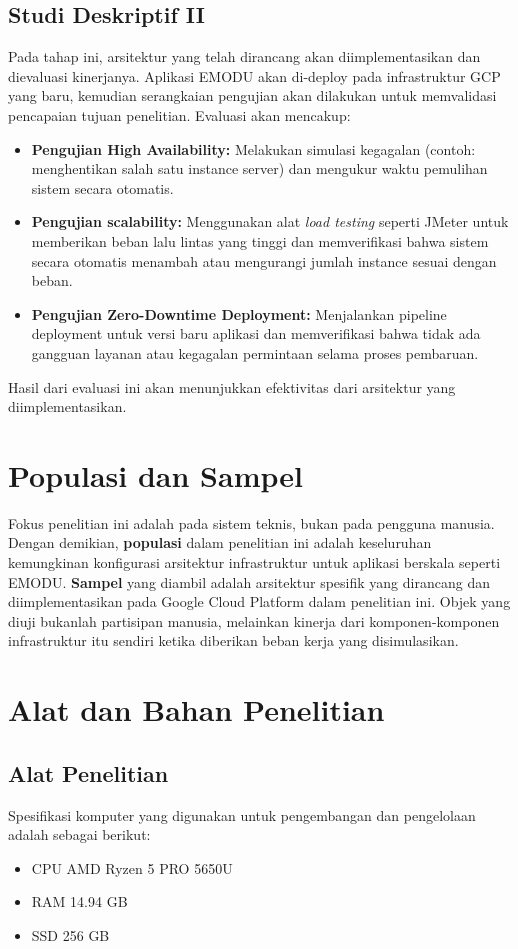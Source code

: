 \subsection{Studi Deskriptif II}
Pada tahap ini, arsitektur yang telah dirancang akan diimplementasikan dan dievaluasi kinerjanya.
Aplikasi EMODU akan di-deploy pada infrastruktur GCP yang baru, kemudian serangkaian pengujian akan dilakukan untuk memvalidasi pencapaian tujuan penelitian.
Evaluasi akan mencakup:
\begin{itemize}
    \item \textbf{Pengujian High Availability:} Melakukan simulasi kegagalan (contoh: menghentikan salah satu instance server) dan mengukur waktu pemulihan sistem secara otomatis.
    \item \textbf{Pengujian scalability:} Menggunakan alat \textit{load testing} seperti JMeter untuk memberikan beban lalu lintas yang tinggi dan memverifikasi bahwa sistem secara otomatis menambah atau mengurangi jumlah instance sesuai dengan beban.
    \item \textbf{Pengujian Zero-Downtime Deployment:} Menjalankan pipeline deployment untuk versi baru aplikasi dan memverifikasi bahwa tidak ada gangguan layanan atau kegagalan permintaan selama proses pembaruan.
\end{itemize}
Hasil dari evaluasi ini akan menunjukkan efektivitas dari arsitektur yang diimplementasikan.

\section{Populasi dan Sampel}
Fokus penelitian ini adalah pada sistem teknis, bukan pada pengguna manusia.
Dengan demikian, \textbf{populasi} dalam penelitian ini adalah keseluruhan kemungkinan konfigurasi arsitektur infrastruktur untuk aplikasi berskala seperti EMODU.
\textbf{Sampel} yang diambil adalah arsitektur spesifik yang dirancang dan diimplementasikan pada Google Cloud Platform dalam penelitian ini.
Objek yang diuji bukanlah partisipan manusia, melainkan kinerja dari komponen-komponen infrastruktur itu sendiri ketika diberikan beban kerja yang disimulasikan.

\section{Alat dan Bahan Penelitian}
\subsection{Alat Penelitian}
Spesifikasi komputer yang digunakan untuk pengembangan dan pengelolaan adalah sebagai berikut:
\begin{itemize}
  \item CPU AMD Ryzen 5 PRO 5650U
  \item RAM 14.94 GB
  \item SSD 256 GB
\end{itemize}

